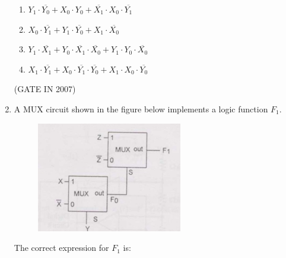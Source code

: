 \documentclass[journal]{IEEEtran}
\begin{document}
\begin{enumerate}
\begin{enumerate}
  \item $ Y_1 \cdot \overline{Y_0} + X_0 \cdot Y_0 + \overline{X_1} \cdot X_0 \cdot \overline{Y_1} $
  \item $ X_0\cdot  \overline{Y_1} + Y_1 \cdot \overline{Y_0} + X_1 \cdot \overline{X_0} $
  \item $ Y_1 \cdot  \overline{X_1} + Y_0 \cdot \overline{X_1} \cdot \overline{X_0} + Y_1 \cdot  Y_0 \cdot  \overline{X_0} $
  \item $ X_1 \cdot \overline{Y_1} + X_0 \cdot \overline{Y_1} \cdot \overline{Y_0} + X_1 \cdot X_0 \cdot \overline{Y_0} $
\end{enumerate}


\hfill(GATE IN 2007)

  \item A MUX circuit shown in the figure below implements a logic function $ F_1 $.
\begin{figure}[H]
    \centering
      \includegraphics[width=0.6\textwidth]{38.jpg} 
      \caption{}
    \label{fig:fig38} 
\end{figure}
  The correct expression for $ F_1 $ is:


\end{enumerate}
\end{document}

